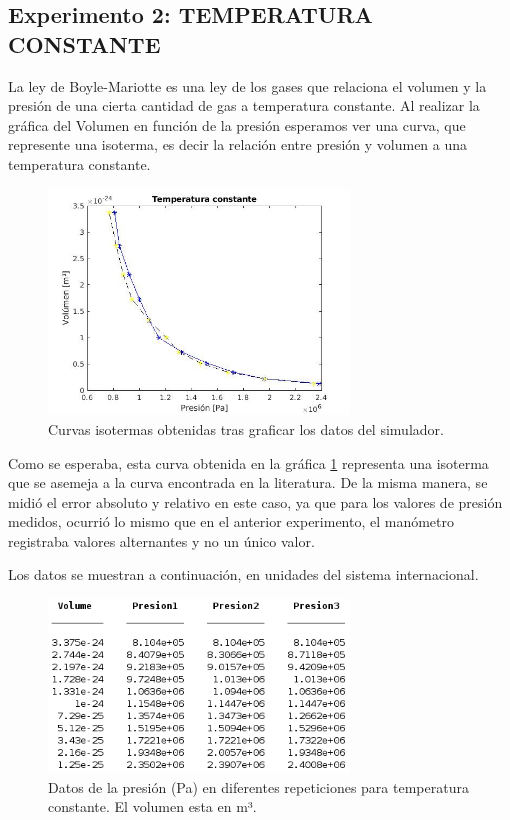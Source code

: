 \documentclass[journal,transmag]{IEEEtran}
\begin{document}
\subsection{Experimento 2: TEMPERATURA CONSTANTE}

La ley de Boyle-Mariotte es una ley de los gases que relaciona el volumen y la presión de una cierta cantidad de gas a temperatura constante. Al realizar la gráfica del Volumen en función de la presión esperamos ver una curva, que represente una isoterma, es decir la relación entre presión y volumen a una temperatura constante.  

\begin{figure}[!h]
				\center
				\includegraphics[width=8cm]{img/temcte.jpg}
				\caption{Curvas isotermas obtenidas tras graficar los datos del simulador.}
				\label{f17}
	\end{figure}
	
Como se esperaba, esta curva obtenida en la gráfica \ref{f17} representa una isoterma que se asemeja a la curva encontrada en la literatura. 
De la misma manera, se midió el error absoluto y relativo en este caso, ya que para los valores de presión medidos, ocurrió lo mismo que en el anterior experimento, el manómetro registraba valores alternantes y no un único valor.

Los datos se muestran a continuación, en unidades del sistema internacional.
\begin{figure}[!h]
				\center
				\includegraphics[width=8cm]{img/t3.png}
				\caption{Datos de la presión (Pa) en diferentes repeticiones para temperatura constante. El volumen esta en m³.}
				\label{f18}
	\end{figure}
	
\end{document}

